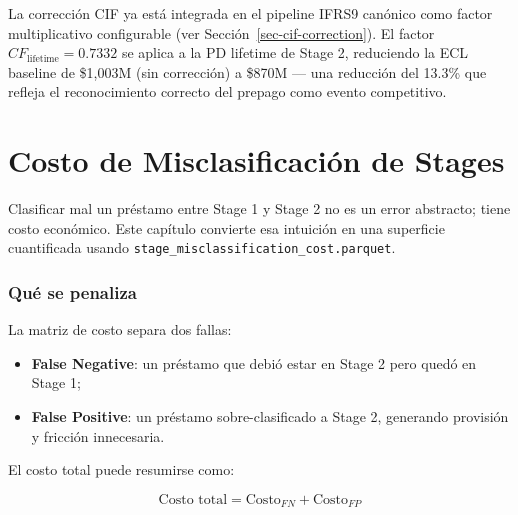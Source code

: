 \documentclass[
  spanish,
  11pt,
  letterpaper,
]{scrbook}
\providecommand{\tightlist}{%
  \setlength{\itemsep}{0pt}\setlength{\parskip}{0pt}}
\theoremstyle{plain}
\theoremstyle{remark}
\begin{document}
\begin{tcolorbox}[enhanced jigsaw, arc=.35mm, bottomrule=.15mm, bottomtitle=1mm, breakable, colback=white, colbacktitle=quarto-callout-tip-color!10!white, colframe=quarto-callout-tip-color-frame, coltitle=black, left=2mm, leftrule=.75mm, opacityback=0, opacitybacktitle=0.6, rightrule=.15mm, title=\textcolor{quarto-callout-tip-color}{\faLightbulb}\hspace{0.5em}{Integración canónica}, titlerule=0mm, toprule=.15mm, toptitle=1mm]

La corrección CIF ya está integrada en el pipeline IFRS9 canónico como
factor multiplicativo configurable (ver
Sección~\ref{sec-cif-correction}). El factor
\(CF_{\text{lifetime}} = 0.7332\) se aplica a la PD lifetime de Stage 2,
reduciendo la ECL baseline de \$1,003M (sin corrección) a \$870M --- una
reducción del 13.3\% que refleja el reconocimiento correcto del prepago
como evento competitivo.

\end{tcolorbox}

\chapter{Costo de Misclasificación de Stages}\label{sec-stage-cost}

Clasificar mal un préstamo entre Stage 1 y Stage 2 no es un error
abstracto; tiene costo económico. Este capítulo convierte esa intuición
en una superficie cuantificada usando
\texttt{stage\_misclassification\_cost.parquet}.

\subsection{Qué se penaliza}\label{quuxe9-se-penaliza}

La matriz de costo separa dos fallas:

\begin{itemize}
\tightlist
\item
  \textbf{False Negative}: un préstamo que debió estar en Stage 2 pero
  quedó en Stage 1;
\item
  \textbf{False Positive}: un préstamo sobre-clasificado a Stage 2,
  generando provisión y fricción innecesaria.
\end{itemize}

El costo total puede resumirse como:

\[
\text{Costo total} = \text{Costo}_{FN} + \text{Costo}_{FP}
\]
\end{document}
